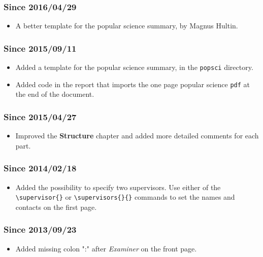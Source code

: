 \subsubsection{Since 2016/04/29}
\begin{itemize}
\item A better template for the popular science summary, by Magnus Hultin.
\end{itemize}

\subsubsection{Since 2015/09/11}
\begin{itemize}
\item Added a template for the popular science summary, in the \verb+popsci+ directory.
\item Added code in the report that imports the one page popular science \texttt{pdf} at the end of the document.
\end{itemize}

\subsubsection{Since 2015/04/27}
\begin{itemize}
\item Improved the \textbf{Structure} chapter and added more detailed comments for each part.
\end{itemize}

\subsubsection{Since 2014/02/18}
\begin{itemize}
\item Added the possibility to specify two supervisors. Use either of the \verb+\supervisor{}+ or \verb+\supervisors{}{}+ commands to set the names and contacts on the first page.
\end{itemize}

\subsubsection{Since 2013/09/23}
\begin{itemize}
\item Added missing colon ":" after \textit{Examiner} on the front page. 
\end{itemize}

